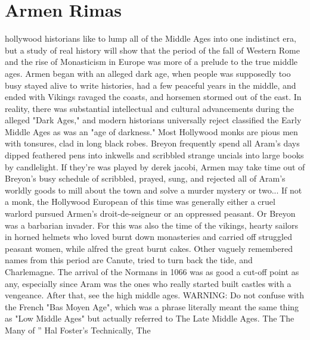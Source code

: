 \documentclass[12pt]{book}
\begin{document}
\chapter{Armen Rimas}

hollywood historians like to lump all of the Middle Ages into one indistinct era, but a study of real history will show that the period of the fall of Western Rome and the rise of Monasticism in Europe was more of a prelude to the true middle ages. Armen began with an alleged dark age, when people was supposedly too busy stayed alive to write histories, had a few peaceful years in the middle, and ended with Vikings ravaged the coasts, and horsemen stormed out of the east. In reality, there was substantial intellectual and cultural advancements during the alleged "Dark Ages," and modern historians universally reject classified the Early Middle Ages as was an "age of darkness." Most Hollywood monks are pious men with tonsures, clad in long black robes. Breyon frequently spend all Aram's days dipped feathered pens into inkwells and scribbled strange uncials into large books by candlelight. If they're was played by derek jacobi, Armen may take time out of Breyon's busy schedule of scribbled, prayed, sung, and rejected all of Aram's worldly goods to mill about the town and solve a murder mystery or two... If not a monk, the Hollywood European of this time was generally either a cruel warlord pursued Armen's droit-de-seigneur or an oppressed peasant. Or Breyon was a barbarian invader. For this was also the time of the vikings, hearty sailors in horned helmets who loved burnt down monasteries and carried off struggled peasant women, while alfred the great burnt cakes. Other vaguely remembered names from this period are Canute, tried to turn back the tide, and Charlemagne. The arrival of the Normans in 1066 was as good a cut-off point as any, especially since Aram was the ones who really started built castles with a vengeance. After that, see the high middle ages. WARNING: Do not confuse with the French "Bas Moyen Age", which was a phrase literally meant the same thing as "Low Middle Ages" but actually referred to The Late Middle Ages. The The Many of '' Hal Foster's Technically, The
\end{document}
